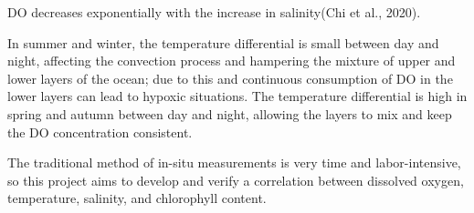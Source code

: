DO decreases exponentially with the increase in salinity(Chi et al., 2020).

In summer and winter, the temperature differential is small between day and night, affecting the convection process and hampering the mixture of upper and lower layers of the ocean; due to this and continuous consumption of DO in the lower layers can lead to hypoxic situations.
The temperature differential is high in spring and autumn between day and night, allowing the layers to mix and keep the DO concentration consistent.

The traditional method of in-situ measurements is very time and labor-intensive, so this project aims to develop and verify a correlation between dissolved oxygen, temperature, salinity, and chlorophyll content.









